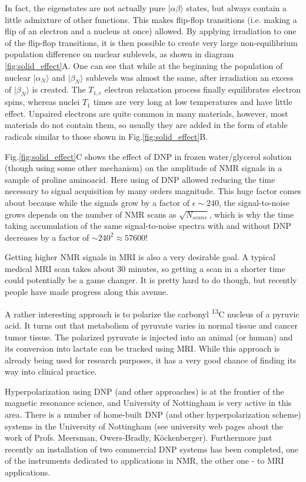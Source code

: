 \documentclass[a4paper, 12pt]{article}
\begin{document}
  In fact, the eigenstates are not actually pure $\vert \alpha \beta \rangle$  states, but always contain a little admixture of other functions. This makes flip-flop transitions (i.e. making a flip of an electron and a nucleus at once) allowed. By applying  irradiation to one of the flip-flop transitions, it is then possible to create very large non-equilibrium population difference on nuclear sublevels, as shown in diagram \ref{fig:solid_effect}A. One can see that while at the beginning the population of nuclear $\vert \alpha_N \rangle$ and $\vert \beta_N \rangle$ sublevels was almost the same, after irradiation an excess of $\vert \beta_N \rangle$ is created. The $T_{1,e}$ electron relaxation process finally equilibrates electron spins, whereas nuclei $T_1$ times are very long at low temperatures and have little effect. Unpaired electrons are quite common in many materials, however, most materials do not contain them, so usually they are added in the form of stable radicals similar to those shown in Fig.\ref{fig:solid_effect}B.
 
  Fig.\ref{fig:solid_effect}C shows the effect of DNP in frozen water/glycerol solution (though using some other mechanism) on the amplitude of NMR signals in a  sample of proline aminoacid. Here using of DNP allowed reducing the time necessary to signal acquisition by many orders magnitude. This huge factor comes about because while the signals grow by a factor of $\epsilon \sim 240$, the signal-to-noise grows depends on the number of NMR scans as $\sqrt{N_{scans}}$, which is why the time taking accumulation of the same signal-to-noise spectra with and without DNP decreases by a factor of $\sim 240^{2} \approx 57600$!
  
  Getting higher NMR signals in MRI is also a very desirable goal. A typical medical MRI scan takes about 30 minutes, so getting a scan in a shorter time could potentially be a game changer. It is pretty hard to do though, but recently people have made progress along this avenue.
  
  A rather interesting approach is to polarize the carbonyl \textsuperscript{13}C nucleus of a pyruvic acid. It turns out that metabolism of pyruvate varies in normal tissue and cancer tumor tissue. The polarized pyruvate is injected into an animal (or human) and its conversion into lactate can be tracked using MRI. While this approach is already being used for research purposes, it has a very good chance of finding its way into clinical practice.
  
  Hyperpolarization using DNP (and other approaches) is at the frontier of the magnetic resonance science, and University of Nottingham is very active in this area. There is a number of home-built DNP (and other hyperpolarization scheme) systems in the University of Nottingham (see university web pages about the work of Profs. Meersman, Owers-Bradly, K{\"o}ckenberger). Furthermore just recently an installation of two commercial DNP systems has been completed, one of the instruments dedicated to applications in NMR, the other one - to MRI applications.
\end{document}
